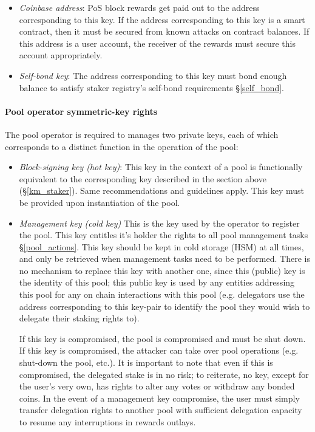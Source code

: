 \begin{itemize}
    \item \textit{Coinbase address}: PoS block rewards get paid out to the address corresponding to this key. If the address corresponding to this key is a smart contract, then it must be secured from known attacks on contract balances. If this address is a user account, the receiver of the rewards must secure this account appropriately.
    
    \item \textit{Self-bond key}: The address corresponding to this key must bond enough balance to satisfy staker registry's self-bond requirements \S\ref{self_bond}. 
\end{itemize}


\paragraph{Pool operator symmetric-key rights} The pool operator is required to manages two private keys, each of which corresponds to a distinct function in the operation of the pool: 
\begin{itemize}
   
    \item \textit{Block-signing key (hot key)}: This key in the context of a pool is functionally equivalent to the corresponding key described in the section above (\S\ref{km_staker}). Same recommendations and guidelines apply. This key must be provided upon instantiation of the pool. 
    
    \item \textit{Management key (cold key)}  This is the key used by the operator to register the pool. This key entitles it's holder the rights to all pool management tasks \S\ref{pool_actions}. This key should be kept in cold storage (HSM) at all times, and only be retrieved when management tasks need to be performed. There is no mechanism to replace this key with another one, since this (public) key is the identity of this pool; this public key is used by any entities addressing this pool for any on chain interactions with this pool (e.g. delegators use the address corresponding to this key-pair to identify the pool they would wish to delegate their staking rights to). 
    
    If this key is compromised, the pool is compromised and must be shut down. If this key is compromised, the attacker can take over pool operations (e.g. shut-down the pool, etc.). It is important to note that even if this  is compromised, the delegated stake is in no risk; to reiterate, no key, except for the user's very own, has rights to alter any votes or withdraw any bonded coins. In the event of a management key compromise, the user must simply transfer delegation rights to another pool with sufficient delegation capacity to resume any interruptions in rewards outlays. 
\end{itemize}

